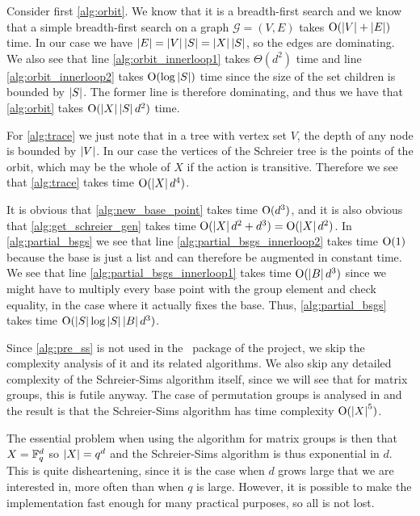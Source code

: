 Consider first \ref{alg:orbit}. We know that it is a breadth-first
search and we know that a simple breadth-first search on a graph
$\mathcal{G} = (V, E)$ takes $\operatorname{O} ( \left\lvert V \right\rvert + \left\lvert E \right\rvert )$ time. In our case
we have $\left\lvert E \right\rvert = \left\lvert V \right\rvert \left\lvert S \right\rvert = \left\lvert X \right\rvert \left\lvert S \right\rvert$, so the edges
are dominating. We also see that line \ref{alg:orbit_innerloop1}
takes $\Theta(d^2)$ time and line \ref{alg:orbit_innerloop2} takes
$\operatorname{O} ( \log{\left\lvert S \right\rvert} )$ time since the size of the set
\textsf{children} is bounded by $\left\lvert S \right\rvert$. The former line is therefore dominating, and thus we have that
\ref{alg:orbit} takes $\operatorname{O} ( \left\lvert X \right\rvert\left\lvert S \right\rvert d^2 )$ time.

For \ref{alg:trace} we just note that in a tree with vertex set $V$,
the depth of any node is bounded by $\left\lvert V \right\rvert$. In our case the
vertices of the Schreier tree is the points of the orbit, which may be
the whole of $X$ if the action is transitive. Therefore we see that
\ref{alg:trace} takes time $\operatorname{O} ( \left\lvert X \right\rvert d^4 )$.

It is obvious that \ref{alg:new_base_point} takes time $\operatorname{O} ( d^3 )$, and
it is also obvious that \ref{alg:get_schreier_gen} takes time
$\operatorname{O} ( \left\lvert X \right\rvert d^2 + d^3 ) = \operatorname{O} ( \left\lvert X \right\rvert d^2 )$. In \ref{alg:partial_bsgs}
we see that line \ref{alg:partial_bsgs_innerloop2} takes time $\operatorname{O} ( 1 )$
because the base is just a list and can therefore be augmented in
constant time. We see that line \ref{alg:partial_bsgs_innerloop1}
takes time $\operatorname{O} ( \left\lvert B \right\rvert d^3 )$ since we might have to multiply every
base point with the group element and check equality, in the case
where it actually fixes the base. Thus, \ref{alg:partial_bsgs} takes
time $\operatorname{O} ( \left\lvert S \right\rvert \log{\left\lvert S \right\rvert} \left\lvert B \right\rvert d^3 )$.

Since \ref{alg:pre_ss} is not used in the \GAP~package of the project,
we skip the complexity analysis of it and its related algorithms. We also skip any detailed complexity
of the Schreier-Sims algorithm itself, since we will see that for
matrix groups, this is futile anyway. The case of permutation groups is
analysed in \cite{butler91} and the result is that the Schreier-Sims
algorithm has time complexity $\operatorname{O} ( \left\lvert X \right\rvert^5 )$. 

The essential problem
when using the algorithm for matrix groups is then that $X = \mathbb{F}_q^d$
so $\left\lvert X \right\rvert = q^d$ and the Schreier-Sims algorithm is thus exponential
in $d$. This is quite disheartening, since it is the case when $d$
grows large that we are interested in, more often than when $q$ is
large. However, it is possible to make the implementation fast enough for many practical purposes, so all is not lost.


